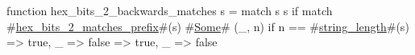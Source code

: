 function hex_bits_2_backwards_matches s = match s {
  s if match #\hyperref[sailRISCVzhexzybitszy2zymatcheszyprefix]{hex\_bits\_2\_matches\_prefix}#(s) {
    #\hyperref[sailRISCVzSome]{Some}# (_, n) if n == #\hyperref[sailRISCVzstringzylength]{string\_length}#(s) => true,
    _ => false
  } => true,
  _ => false
}
